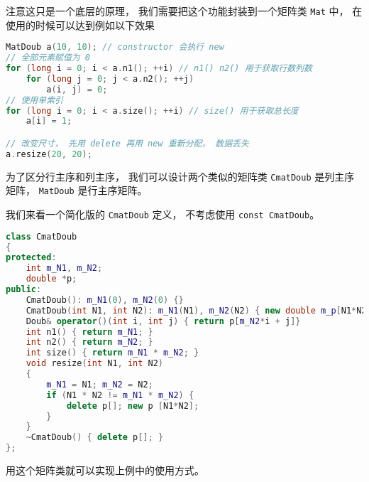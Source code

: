 注意这只是一个底层的原理， 我们需要把这个功能封装到一个矩阵类 \verb|Mat| 中， 在使用的时候可以达到例如以下效果
\begin{lstlisting}[language=cpp]
MatDoub a(10, 10); // constructor 会执行 new
// 全部元素赋值为 0
for (long i = 0; i < a.n1(); ++i) // n1() n2() 用于获取行数列数
    for (long j = 0; j < a.n2(); ++j)
        a(i, j) = 0;
// 使用单索引
for (long i = 0; i < a.size(); ++i) // size() 用于获取总长度
    a[i] = 1;

// 改变尺寸， 先用 delete 再用 new 重新分配， 数据丢失
a.resize(20, 20);
\end{lstlisting}
为了区分行主序和列主序， 我们可以设计两个类似的矩阵类 \verb|CmatDoub| 是列主序矩阵， \verb|MatDoub| 是行主序矩阵。

我们来看一个简化版的 \verb|CmatDoub| 定义， 不考虑使用 \verb|const CmatDoub|。
\begin{lstlisting}[language=cpp]
class CmatDoub
{
protected:
    int m_N1, m_N2;
    double *p;
public:
    CmatDoub(): m_N1(0), m_N2(0) {}
    CmatDoub(int N1, int N2): m_N1(N1), m_N2(N2) { new double m_p[N1*N2]; }
    Doub& operator()(int i, int j) { return p[m_N2*i + j]}
    int n1() { return m_N1; }
    int n2() { return m_N2; }
    int size() { return m_N1 * m_N2; }
    void resize(int N1, int N2)
    {
        m_N1 = N1; m_N2 = N2;
        if (N1 * N2 != m_N1 * m_N2) {
            delete p[]; new p [N1*N2];
        }
    }
    ~CmatDoub() { delete p[]; }
};
\end{lstlisting}
用这个矩阵类就可以实现上例中的使用方式。
